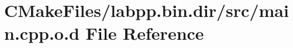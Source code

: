 \hypertarget{CMakeFiles_2labpp_8bin_8dir_2src_2main_8cpp_8o_8d}{}\section{C\+Make\+Files/labpp.bin.\+dir/src/main.cpp.\+o.\+d File Reference}
\label{CMakeFiles_2labpp_8bin_8dir_2src_2main_8cpp_8o_8d}

